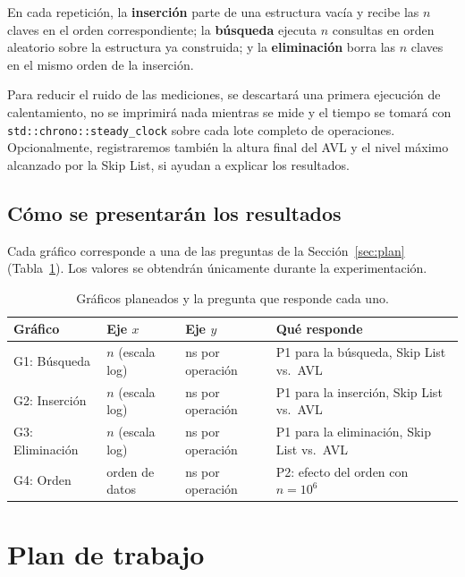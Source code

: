 \documentclass[11pt,a4paper]{article}
\begin{document}
En cada repetición, la \textbf{inserción} parte de una estructura vacía y
recibe las $n$ claves en el orden correspondiente; la \textbf{búsqueda}
ejecuta $n$ consultas en orden aleatorio sobre la estructura ya construida; y
la \textbf{eliminación} borra las $n$ claves en el mismo orden de la
inserción.

Para reducir el ruido de las mediciones, se descartará una primera ejecución
de calentamiento, no se imprimirá nada mientras se mide y el tiempo se tomará
con \texttt{std::chrono::steady\_clock} sobre cada lote completo de
operaciones. Opcionalmente, registraremos también la altura final del AVL y el
nivel máximo alcanzado por la Skip List, si ayudan a explicar los resultados.

\subsection{Cómo se presentarán los resultados}

Cada gráfico corresponde a una de las preguntas de la Sección~\ref{sec:plan} (Tabla~\ref{tab:graficos}). Los valores se obtendrán
únicamente durante la experimentación.

\begin{table}[!htb]
\centering
\renewcommand{\arraystretch}{1.2}
\begin{tabularx}{\textwidth}{l l l X}
\toprule
\textbf{Gráfico} & \textbf{Eje $x$} & \textbf{Eje $y$} & \textbf{Qué responde} \\
\midrule
G1: Búsqueda    & $n$ (escala log) & ns por operación & P1 para la búsqueda, Skip List vs.\ AVL \\
G2: Inserción   & $n$ (escala log) & ns por operación & P1 para la inserción, Skip List vs.\ AVL \\
G3: Eliminación & $n$ (escala log) & ns por operación & P1 para la eliminación, Skip List vs.\ AVL \\
G4: Orden       & orden de datos   & ns por operación & P2: efecto del orden con $n = 10^6$ \\
\bottomrule
\end{tabularx}
\caption{Gráficos planeados y la pregunta que responde cada uno.}
\label{tab:graficos}
\end{table}

\section{Plan de trabajo}\label{sec:cronograma}
\end{document}
